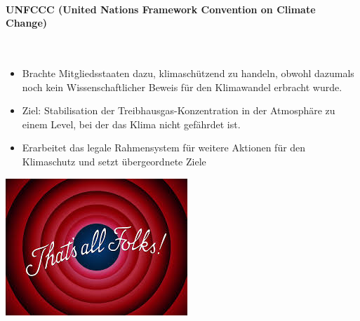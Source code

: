 \documentclass[a4paper, 11pt]{article}
\begin{document}
\paragraph{UNFCCC (United Nations Framework Convention on Climate Change)}\mbox{}\\
\begin{itemize}
    \item Brachte Mitgliedsstaaten dazu, klimaschützend zu handeln, obwohl dazumals noch kein Wissenschaftlicher Beweis für den Klimawandel erbracht wurde.
    \item Ziel: Stabilisation der Treibhausgas-Konzentration in der Atmosphäre zu einem Level, bei der das Klima nicht gefährdet ist.
    \item Erarbeitet das legale Rahmensystem für weitere Aktionen für den Klimaschutz und setzt übergeordnete Ziele
\end{itemize}

\centering
\includegraphics[keepaspectratio=true,height=15\baselineskip]{thatsall.jpeg}
\end{document}
